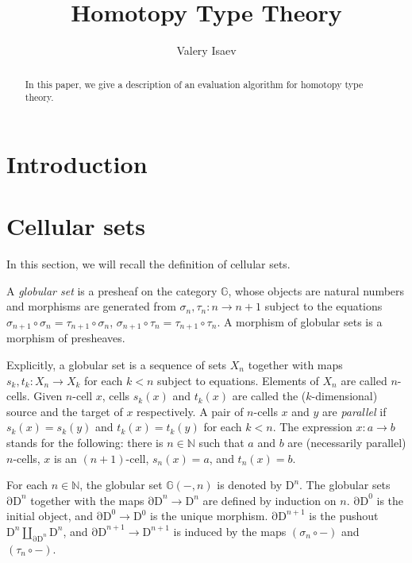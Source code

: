 \documentclass{amsart}
\theoremstyle{definition}
\theoremstyle{remark}
\newcommand{\bbG}{\mathbb{G}}
\newcommand{\nats}{\mathbb{N}}
\newcommand{\Dn}[1][n]{\mathrm{D}^{#1}}
\newcommand{\dDn}[1][n]{\mathrm{\partial D}^{#1}}
\numberwithin{table}{section}
\begin{document}
\title{Homotopy Type Theory}

\author{Valery Isaev}

\begin{abstract}
In this paper, we give a description of an evaluation algorithm for homotopy type theory.
\end{abstract}

\maketitle

\section{Introduction}

\section{Cellular sets}

In this section, we will recall the definition of cellular sets.

\begin{defn}
A \emph{globular set} is a presheaf on the category $\bbG$, whose objects are natural numbers and morphisms are generated from
$\sigma_n,\tau_n : n \to n + 1$ subject to the equations
$\sigma_{n+1} \circ \sigma_n = \tau_{n+1} \circ \sigma_n$, $\sigma_{n+1} \circ \tau_n = \tau_{n+1} \circ \tau_n$.
A morphism of globular sets is a morphism of presheaves.
\end{defn}

Explicitly, a globular set is a sequence of sets $X_n$ together with maps $s_k,t_k : X_n \to X_k$ for each $k < n$ subject to equations.
Elements of $X_n$ are called $n$-cells. Given $n$-cell $x$, cells $s_k(x)$ and $t_k(x)$
are called the ($k$-dimensional) source and the target of $x$ respectively.
A pair of $n$-cells $x$ and $y$ are \emph{parallel} if $s_k(x) = s_k(y)$ and $t_k(x) = t_k(y)$ for each $k < n$.
The expression $x : a \to b$ stands for the following:
there is $n \in \nats$ such that $a$ and $b$ are (necessarily parallel) $n$-cells,
$x$ is an $(n+1)$-cell, $s_n(x) = a$, and $t_n(x) = b$.

For each $n \in \nats$, the globular set $\bbG(-,n)$ is denoted by $\Dn$.
The globular sets $\dDn$ together with the maps $\dDn \to \Dn$ are defined by induction on $n$.
$\dDn[0]$ is the initial object, and $\dDn[0] \to \Dn[0]$ is the unique morphism.
$\dDn[n+1]$ is the pushout $\Dn \amalg_{\dDn} \Dn$, and $\dDn[n+1] \to \Dn[n+1]$
is induced by the maps $(\sigma_n \circ -)$ and $(\tau_n \circ -)$.
\end{document}
